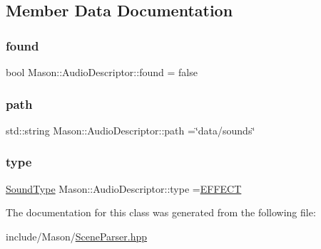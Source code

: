 \subsection{Member Data Documentation}
\hypertarget{class_mason_1_1_audio_descriptor_ab49d1cfecfbd13d161f1bad522bd3294}{}\label{class_mason_1_1_audio_descriptor_ab49d1cfecfbd13d161f1bad522bd3294} 
\subsubsection{\texorpdfstring{found}{found}}
{\footnotesize\ttfamily bool Mason\+::\+Audio\+Descriptor\+::found = false}

\hypertarget{class_mason_1_1_audio_descriptor_a48908da92ad467deffccb4d8340aea20}{}\label{class_mason_1_1_audio_descriptor_a48908da92ad467deffccb4d8340aea20} 
\subsubsection{\texorpdfstring{path}{path}}
{\footnotesize\ttfamily std\+::string Mason\+::\+Audio\+Descriptor\+::path =\char`\"{}data/sounds\char`\"{}}

\hypertarget{class_mason_1_1_audio_descriptor_af0235fd20741197930246f28acb5113b}{}\label{class_mason_1_1_audio_descriptor_af0235fd20741197930246f28acb5113b} 
\subsubsection{\texorpdfstring{type}{type}}
{\footnotesize\ttfamily \hyperlink{namespace_mason_a158d651086d1ba1aacc4c37125b27657}{Sound\+Type} Mason\+::\+Audio\+Descriptor\+::type =\hyperlink{namespace_mason_a158d651086d1ba1aacc4c37125b27657a3ee843ce73fc06de504eb1480c65c82f}{E\+F\+F\+E\+CT}}



The documentation for this class was generated from the following file\+:\begin{DoxyCompactItemize}
\item 
include/\+Mason/\hyperlink{_scene_parser_8hpp}{Scene\+Parser.\+hpp}\end{DoxyCompactItemize}
